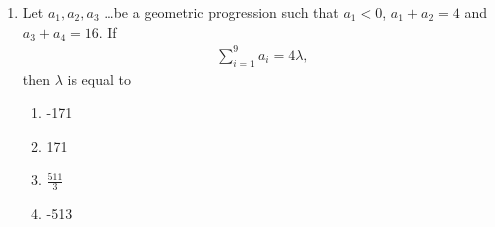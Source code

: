 \begin{enumerate}[label=\thesubsection.\arabic*,ref=\thesubsection.\theenumi]
%  
\item Let $a_1, a_2, a_3 $ \dots be a geometric progression such that $a_1 < 0$, $a_1 + a_2 = 4$ and $a_3 + a_4 = 16$. If\begin{align*}\sum_{i=1}^{9} a_i = 4\lambda,\end{align*}then $\lambda$ is equal to
\hfill{}
\begin{multicols}{4}
\begin{enumerate}
   \item -171
   \item 171
   \item $\frac{511}{3}$
   \item -513
\end{enumerate}
\end{multicols}
\end{enumerate}

